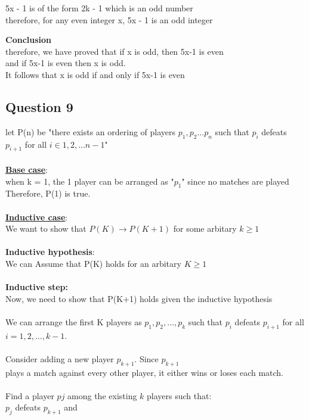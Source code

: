 \documentclass[11pt]{article}
\begin{document}
{{{\noindent
5x - 1 is of the form 2k - 1 which is an odd number \\
therefore, for any even integer x, 5x - 1 is an odd integer

\noindent
\textbf{Conclusion} \\
therefore, we have proved that if x is odd, then 5x-1 is even \\
and if 5x-1 is even then x is odd. \\
It follows that x is odd if and only if 5x-1 is even

\subsection*{Question 9}
let P(n) be "there exists an ordering of players $p_1, p_2...p_n$
such that $p_i$ defeats $p_{i+1}$ for all $i \in 1, 2, ... n-1$"\\\\
%
\underline{\textbf{Base case}}: \\
when k = 1, the 1 player can be arranged as "$p_1$" since no matches are played \\
Therefore, P(1) is true.
\\ \\
\underline{\textbf{Inductive case}}: \\
We want to show that $P(K) \rightarrow P(K+1)$ for some arbitary $k \geq 1$ \\
\\
\textbf{Inductive hypothesis}: \\
We can Assume that P(K) holds for an arbitary $K \geq 1$ \\
\\
\textbf{Inductive step:} \\
Now, we need to show that P(K+1) holds given the inductive hypothesis \\
\\
We can arrange the first K players as $p_1, p_2, \ldots, p_k$
such that $p_i$ defeats $p_{i+1}$ for all
$i = 1, 2, \ldots, k-1$.\\
\\
Consider adding a new player $p_{k+1}$. Since $p_{k+1}$\\
plays a match against every other player, it either wins or loses each match.\\
\\
Find a player $pj$ among the existing $k$ players such that:\\
$p_{j}$ defeats $p_{k+1}$ and \\
}}}
\end{document}
